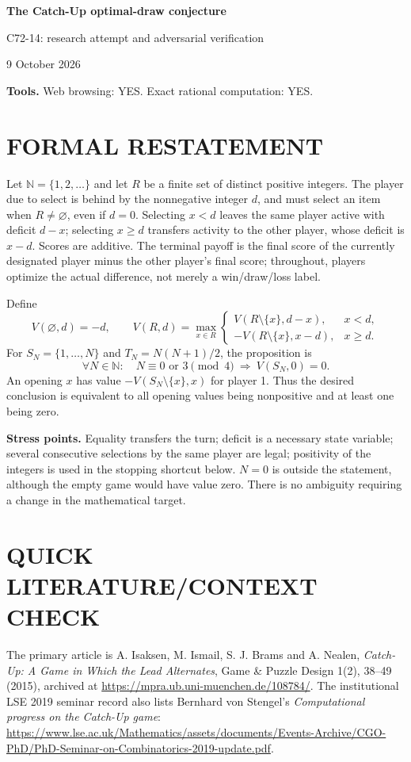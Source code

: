 \documentclass[11pt,a4paper]{article}
\theoremstyle{definition}\newtheorem{definition}[theorem]{Definition}
\theoremstyle{remark}\newtheorem{remark}[theorem]{Remark}
\newcommand{\N}{\mathbb N}\newcommand{\E}{\mathbb E}
\newcommand{\1}{\mathbf 1}
\begin{document}
\begin{center}
{\Large\bfseries The Catch-Up optimal-draw conjecture}\par
\medskip
{\large C72-14: research attempt and adversarial verification}\par
9 October 2026
\end{center}
\textbf{Tools.} Web browsing: YES. Exact rational computation: YES.\par
\section{FORMAL RESTATEMENT}
Let $\N=\{1,2,\ldots\}$ and let $R$ be a finite set of distinct positive integers. The player due to select is behind by the nonnegative integer $d$, and must select an item when $R\ne\varnothing$, even if $d=0$. Selecting $x<d$ leaves the same player active with deficit $d-x$; selecting $x\ge d$ transfers activity to the other player, whose deficit is $x-d$. Scores are additive. The terminal payoff is the final score of the currently designated player minus the other player's final score; throughout, players optimize the actual difference, not merely a win/draw/loss label.

Define
\[
 V(\varnothing,d)=-d,\qquad
 V(R,d)=\max_{x\in R}\begin{cases}
 V(R\setminus\{x\},d-x),&x<d,\\
 -V(R\setminus\{x\},x-d),&x\ge d.
 \end{cases}
\]
For $S_N=\{1,\ldots,N\}$ and $T_N=N(N+1)/2$, the proposition is
\[
 \forall N\in\N:\quad N\equiv0\text{ or }3\pmod4
 \ \Longrightarrow\ V(S_N,0)=0.
\]
An opening $x$ has value $-V(S_N\setminus\{x\},x)$ for player 1. Thus the desired conclusion is equivalent to all opening values being nonpositive and at least one being zero.

\textbf{Stress points.} Equality transfers the turn; deficit is a necessary state variable; several consecutive selections by the same player are legal; positivity of the integers is used in the stopping shortcut below. $N=0$ is outside the statement, although the empty game would have value zero. There is no ambiguity requiring a change in the mathematical target.

\section{QUICK LITERATURE/CONTEXT CHECK}
The primary article is A. Isaksen, M. Ismail, S. J. Brams and A. Nealen, \emph{Catch-Up: A Game in Which the Lead Alternates}, Game \& Puzzle Design 1(2), 38--49 (2015), archived at \url{https://mpra.ub.uni-muenchen.de/108784/}. The institutional LSE 2019 seminar record also lists Bernhard von Stengel's \emph{Computational progress on the Catch-Up game}: \url{https://www.lse.ac.uk/Mathematics/assets/documents/Events-Archive/CGO-PhD/PhD-Seminar-on-Combinatorics-2019-update.pdf}.
\end{document}
